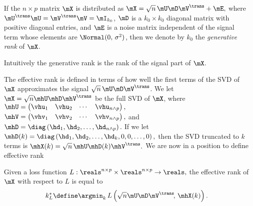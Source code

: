 \begin{definition}
    If the $n \times p$ matrix $\mX$ is distributed as
    \(
        \mX = \sqrt{n} \, \mU \mD \mV^\trans + \mE,
    \)
    where $\mU^\trans \mU = \mV^\trans \mV = \mI_{k_0}$, $\mD$ is a
    $k_0 \times k_0$ diagonal matrix with positive diagonal entries, and $\mE$
    is a noise matrix independent of the signal term whose elements are
    \iid $\Normal( 0, \, \sigma^2 )$, then
    we denote by $k_0$ the \emph{generative rank} of $\mX$.
\end{definition}

\noindent 
Intuitively the generative rank is the rank of the signal part of $\mX$.

The effective rank is defined in terms of how well the first terms of the
SVD of $\mX$ approximates the signal $\sqrt{n} \, \mU \mD \mV^\trans$.  We
let $\mX = \sqrt{n} \mhU \mhD \mhV^\trans$ be the full SVD of $\mX$, where
\(
    \mhU
    =
    \left(
    \begin{matrix}
        \vhu_1 & \vhu_2 & \cdots & \vhu_{n\wedge p}
    \end{matrix}
    \right),
\)
\(
    \mhV
    =
    \left(
    \begin{matrix}
        \vhv_1 & \vhv_2 & \cdots & \vhv_{n\wedge p}
    \end{matrix}
    \right),
\)
and
\(
    \mhD
    =
    \diag \left(
        \hd_1, \hd_2, \ldots, \hd_{n\wedge p}
    \right).
\)
If we let
\(
    \mhD(k)
    =
    \diag \left(
        \hd_1, \hd_2, \ldots, \hd_k, 0, 0, \ldots, 0
    \right),
\)
then the SVD truncated to $k$ terms is
\(
    \mhX(k)
    =
    \sqrt{n} \,
    \mhU \mhD(k) \mhV^\trans.
\)
We are now in a position to define effective rank

\begin{definition}
    Given a loss function
    \(
        L : \reals^{n \times p} \times \reals^{n \times p} \to \reals,
    \)
    the effective rank of $\mX$ with respect to $L$ is equal to
    \[
        k_L^\ast
        \define
        \argmin_k \, 
            L \left( 
                \sqrt{n} \mU \mD \mV^\trans\!, \, \mhX(k) 
            \right).
    \]
\end{definition}

